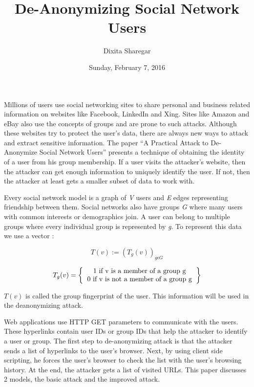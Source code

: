 \documentclass{article}
\title {De-Anonymizing Social Network Users}
\author{Dixita Sharegar}
\date{Sunday, February 7, 2016}
\begin{document}
\maketitle
Millions of users use social networking sites to share personal and business related information on websites like Facebook, LinkedIn and Xing. Sites like Amazon and eBay also use the concepts of groups and are prone to such attacks. Although these websites try to protect the user’s data, there are always new ways to attack and extract sensitive information. The paper “A Practical Attack to De-Anonymize Social Network Users” presents a technique of obtaining the identity of a user from his group membership. If a user visits the attacker’s website, then the attacker can get enough information to uniquely identify the user. If not, then the attacker at least gets a smaller subset of data to work with. \\
\par Every social network model is a graph of \textit{V} users and \textit{E} edges representing friendship between them. Social networks also have groups \textit{G} where many users with common interests or demographics join. A user can belong to multiple groups where every individual group is represented by \textit{g}. To represent this data we use a vector :

\begin{equation}
T(v):=(T_g(v))_{g \epsilon G}
\end{equation}

$$T_g(v)= 
\left
 \{
  \begin{tabular}{ccc}
  1 if v is a member of a group g\\
  0 if v is not a member of a group g
  \end{tabular}
\right \}$$


 \(T(v)\)  is called the group fingerprint of the user. This information will be used in the deanonymizing attack. \\
\par Web applications use HTTP GET parameters to communicate with the users. These hyperlinks contain user IDs or group IDs that help the attacker to identify a user or group. The first step to de-anonymizing attack is that the attacker sends a list of hyperlinks to the user’s browser. Next, by using client side scripting, he forces the user’s browser to check the list with the user’s browsing history. At the end, the attacker gets a list of visited URLs. This paper discusses 2 models, the basic attack and the improved attack.
\end{document}
